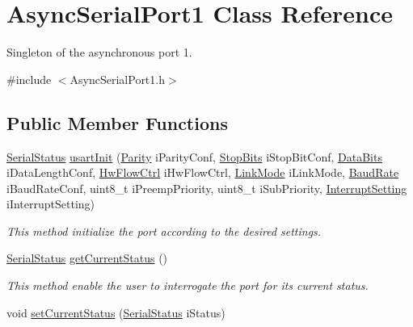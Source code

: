\hypertarget{class_async_serial_port1}{\section{\-Async\-Serial\-Port1 \-Class \-Reference}
\label{class_async_serial_port1}
}


\-Singleton of the asynchronous port 1.  




{\ttfamily \#include $<$\-Async\-Serial\-Port1.\-h$>$}

\subsection*{\-Public \-Member \-Functions}
\begin{DoxyCompactItemize}
\item 
\hyperlink{_serial_type_8h_a71c113451bfafdaf5fcabcd807acd480}{\-Serial\-Status} \hyperlink{class_async_serial_port1_a3f62abb242f09bb35524d31996c88320}{usart\-Init} (\hyperlink{_serial_type_8h_ac47b2bd906d2c843b97ecae6c1eea710}{\-Parity} i\-Parity\-Conf, \hyperlink{_serial_type_8h_a2e4c31ec0a94db405865b7c241717fbe}{\-Stop\-Bits} i\-Stop\-Bit\-Conf, \hyperlink{_serial_type_8h_a11275f46707b20c44d7b07eb6ca04baf}{\-Data\-Bits} i\-Data\-Length\-Conf, \hyperlink{_serial_type_8h_a0ed0ee4a49d7dcf4109ba39a3ca1a8b7}{\-Hw\-Flow\-Ctrl} i\-Hw\-Flow\-Ctrl, \hyperlink{_serial_type_8h_a30da35a35e2d0882c738f6f991905df7}{\-Link\-Mode} i\-Link\-Mode, \hyperlink{_serial_type_8h_a7654bd82719bfde1c792d7828664dde2}{\-Baud\-Rate} i\-Baud\-Rate\-Conf, uint8\-\_\-t i\-Preemp\-Priority, uint8\-\_\-t i\-Sub\-Priority, \hyperlink{_serial_type_8h_ad8005790f3b92862aa09c52f14f58e24}{\-Interrupt\-Setting} i\-Interrupt\-Setting)
\begin{DoxyCompactList}\small\item\em \-This method initialize the port according to the desired settings. \end{DoxyCompactList}\item 
\hyperlink{_serial_type_8h_a71c113451bfafdaf5fcabcd807acd480}{\-Serial\-Status} \hyperlink{class_async_serial_port1_adfc4561e4d464389eb6dc16886d8e21d}{get\-Current\-Status} ()
\begin{DoxyCompactList}\small\item\em \-This method enable the user to interrogate the port for its current status. \end{DoxyCompactList}\item 
\hypertarget{class_async_serial_port1_ad62d4d10e37dc483addf7df23f3cd4dc}{void \hyperlink{class_async_serial_port1_ad62d4d10e37dc483addf7df23f3cd4dc}{set\-Current\-Status} (\hyperlink{_serial_type_8h_a71c113451bfafdaf5fcabcd807acd480}{\-Serial\-Status} i\-Status)}\label{class_async_serial_port1_ad62d4d10e37dc483addf7df23f3cd4dc}


\end{DoxyCompactItemize}
